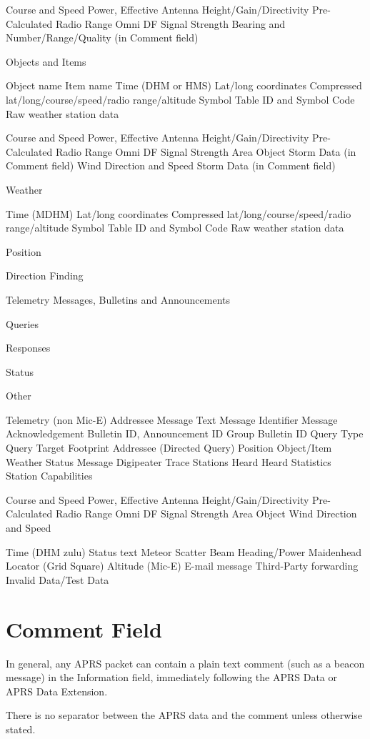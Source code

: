 Course and Speed
Power, Effective Antenna Height/Gain/Directivity
Pre-Calculated Radio Range
Omni DF Signal Strength
Bearing and Number/Range/Quality
(in Comment field)

Objects and
Items

Object name
Item name
Time (DHM or HMS)
Lat/long coordinates
Compressed lat/long/course/speed/radio range/altitude
Symbol Table ID and Symbol Code
Raw weather station data

Course and Speed
Power, Effective Antenna Height/Gain/Directivity
Pre-Calculated Radio Range
Omni DF Signal Strength
Area Object
Storm Data (in Comment field)
Wind Direction and Speed
Storm Data (in Comment field)

Weather

Time (MDHM)
Lat/long coordinates
Compressed lat/long/course/speed/radio range/altitude
Symbol Table ID and Symbol Code
Raw weather station data

Position

Direction Finding

Telemetry
Messages,
Bulletins and
Announcements

Queries

Responses

Status

Other

Telemetry (non Mic-E)
Addressee
Message Text
Message Identifier
Message Acknowledgement
Bulletin ID, Announcement ID
Group Bulletin ID
Query Type
Query Target Footprint
Addressee (Directed Query)
Position
Object/Item
Weather
Status
Message
Digipeater Trace
Stations Heard
Heard Statistics
Station Capabilities

Course and Speed
Power, Effective Antenna Height/Gain/Directivity
Pre-Calculated Radio Range
Omni DF Signal Strength
Area Object
Wind Direction and Speed

Time (DHM zulu)
Status text
Meteor Scatter Beam Heading/Power
Maidenhead Locator (Grid Square)
Altitude (Mic-E)
E-mail message
Third-Party forwarding
Invalid Data/Test Data


\section{Comment Field}

In general, any APRS packet can contain a plain text comment (such as a
beacon message) in the Information field, immediately following the APRS
Data or APRS Data Extension.

There is no separator between the APRS data and the comment unless
otherwise stated.


